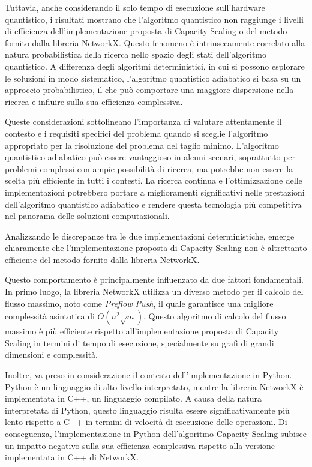 \documentclass{article}
\begin{document}
Tuttavia, anche considerando il solo tempo di esecuzione sull'hardware quantistico, i risultati mostrano che l'algoritmo quantistico non raggiunge i livelli di efficienza dell'implementazione proposta di Capacity Scaling o del metodo fornito dalla libreria NetworkX. Questo fenomeno è intrinsecamente correlato alla natura probabilistica della ricerca nello spazio degli stati dell'algoritmo quantistico. A differenza degli algoritmi deterministici, in cui si possono esplorare le soluzioni in modo sistematico, l'algoritmo quantistico adiabatico si basa su un approccio probabilistico, il che può comportare una maggiore dispersione nella ricerca e influire sulla sua efficienza complessiva.

Queste considerazioni sottolineano l'importanza di valutare attentamente il contesto e i requisiti specifici del problema quando si sceglie l'algoritmo appropriato per la risoluzione del problema del taglio minimo. L'algoritmo quantistico adiabatico può essere vantaggioso in alcuni scenari, soprattutto per problemi complessi con ampie possibilità di ricerca, ma potrebbe non essere la scelta più efficiente in tutti i contesti. La ricerca continua e l'ottimizzazione delle implementazioni potrebbero portare a miglioramenti significativi nelle prestazioni dell'algoritmo quantistico adiabatico e rendere questa tecnologia più competitiva nel panorama delle soluzioni computazionali.

Analizzando le discrepanze tra le due implementazioni deterministiche, emerge chiaramente che l'implementazione proposta di Capacity Scaling non è altrettanto efficiente del metodo fornito dalla libreria NetworkX.

Questo comportamento è principalmente influenzato da due fattori fondamentali. In primo luogo, la libreria NetworkX utilizza un diverso metodo per il calcolo del flusso massimo, noto come \emph{Preflow Push}, il quale garantisce una migliore complessità asintotica di $O(n^2\sqrt{m})$. Questo algoritmo di calcolo del flusso massimo è più efficiente rispetto all'implementazione proposta di Capacity Scaling in termini di tempo di esecuzione, specialmente su grafi di grandi dimensioni e complessità.

Inoltre, va preso in considerazione il contesto dell'implementazione in Python. Python è un linguaggio di alto livello interpretato, mentre la libreria NetworkX è implementata in C++, un linguaggio compilato. A causa della natura interpretata di Python, questo linguaggio risulta essere significativamente più lento rispetto a C++ in termini di velocità di esecuzione delle operazioni. Di conseguenza, l'implementazione in Python dell'algoritmo Capacity Scaling subisce un impatto negativo sulla sua efficienza complessiva rispetto alla versione implementata in C++ di NetworkX.
\end{document}
